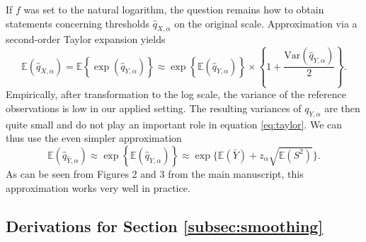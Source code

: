 \documentclass{article}
\begin{document}
If $f$ was set to the natural logarithm, the question remains how to obtain statements concerning thresholds $\hat{q}_{X, \alpha}$ on the original scale. Approximation via a second-order Taylor expansion yields
\begin{equation}
\mathbb{E}(\hat{q}_{X, \alpha}) = \mathbb{E}\left\{\exp(\hat{q}_{Y, \alpha})\right\} \approx \exp\left\{\mathbb{E}(\hat{q}_{Y, \alpha})\right\} \times \left\{1 + \frac{\text{Var}(\hat{q}_{Y, \alpha})}{2} \right\}.
\label{eq:taylor}
\end{equation}
Empirically, after transformation to the log scale, the variance of the reference observations is low in our applied setting. The resulting variances of $q_{Y, \alpha}$ are then quite small and do not play an important role in equation \eqref{eq:taylor}. We can thus use the even simpler approximation
\begin{equation}
\mathbb{E}(\hat{q}_{\hat{Y}, \alpha}) \approx \exp\left\{\mathbb{E}(\hat{q}_{Y, \alpha})\right\} \approx \exp\{\mathbb{E}(\bar{Y}) + z_\alpha \sqrt{\mathbb{E}(S^2)}\}.
\end{equation}
As can be seen from Figures 2 and 3 from the main manuscript, this approximation works very well in practice. %

\subsection{Derivations for Section \ref{subsec:smoothing}}
\end{document}
